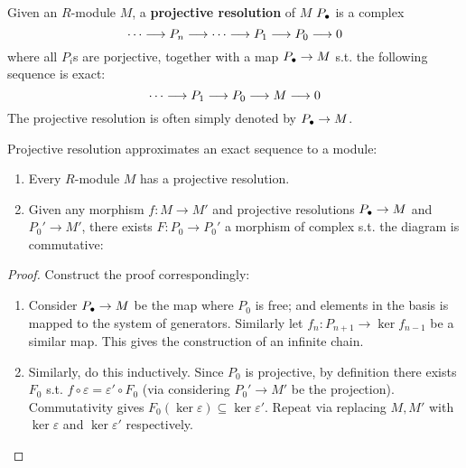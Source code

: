 \documentclass{article}
\begin{document}
\begin{definition}
    Given an $R$-module $M$, a \textbf{projective resolution} of $M$ $P_{\bullet}$ is a complex
    \[
        \cdots \longrightarrow P_n \longrightarrow \cdots \longrightarrow P_1 \longrightarrow P_0 \longrightarrow 0
    \]
    where all $P_i$s are porjective, together with a map $P_{\bullet} \to M$ s.t. the following sequence is exact:
    \[
        \cdots \longrightarrow P_1 \longrightarrow P_0 \longrightarrow M \longrightarrow 0
    \]
    The projective resolution is often simply denoted by $P_{\bullet} \to M$.
\end{definition}

\begin{proposition}
    Projective resolution approximates an exact sequence to a module:
    \begin{enumerate}[label=\roman*)]
        \item Every $R$-module $M$ has a projective resolution.
        \item Given any morphism $f: M \to M'$ and projective resolutions $P_{\bullet} \to M$ and $P_0' \to M'$, there exists $F: P_0 \to P_0'$ a morphism of complex s.t. the diagram is commutative:
        \begin{figure}[htbp]
            \centering
        \end{figure}
    \end{enumerate}
\end{proposition}

\begin{proof}
    Construct the proof correspondingly:
    \begin{enumerate}[label=\roman*)]
        \item Consider $P_{\bullet} \to M$ be the map where $P_0$ is free; and elements in the basis is mapped to the system of generators. Similarly let $f_n: P_{n+1} \to \ker f_{n-1}$ be a similar map. This gives the construction of an infinite chain.
        \item Similarly, do this inductively. Since $P_0$ is projective, by definition there exists $F_0$ s.t. $f \circ \varepsilon = \varepsilon' \circ F_0$ (via considering $P_0' \to M'$ be the projection). Commutativity gives $F_0(\ker \varepsilon) \subseteq \ker \varepsilon'$. Repeat via replacing $M, M'$ with $\ker \varepsilon$ and $\ker \varepsilon'$ respectively. 
    \end{enumerate}
\end{proof}
\end{document}
